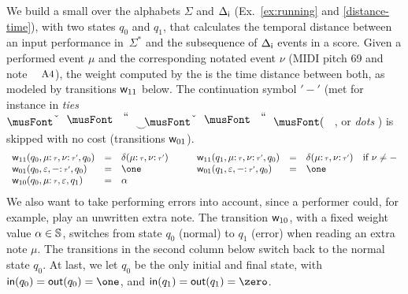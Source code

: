 \begin{example}\label{ex:SWT}
We build a small \SWT over the alphabets $\Sigma$ and ${\Delta_\mathsf{i}}$
(Ex.~\ref{ex:running} and \ref{distance-time}),
with two states $q_0$ and $q_1$, that
calculates the temporal distance between an input performance in~$\Sigma^*$
and the subsequence
of ${\Delta_\mathsf{i}}$ events in a score.
%
Given  a performed event $\mu$
and the corresponding notated event $\nu$
(\eg MIDI pitch 69 and note $\mbox{\footnotesize A4}$),
the weight  computed by the \SWT is the time distance between both,
as modeled by transitions $\mathsf{w}_{11}$ below.
%
The continuation symbol $'-'$
(met for instance in \emph{ties}
$\musQuarter\!\!\!\mathrel{\raisebox{-1.5mm}{$\smile$}}\!\!\!\musEighth$,
or \emph{dots} \musQuarterDotted{})
is  skipped with no cost (transitions $\mathsf{w}_{01}$).
\[
\begin{array}{lclclcll}
\wei_{11}(q_0, \mu\tstamp{\tau}, \nu\tstamp{\tau'}, q_0) & = &
     \delta(\mu\tstamp{\tau}, \nu\tstamp{\tau'}) & \quad & %
\wei_{11}(q_1, \mu\tstamp{\tau}, \nu\tstamp{\tau'}, q_0) & = &
     \delta(\mu\tstamp{\tau}, \nu\tstamp{\tau'}) &
     \mbox{if~} \nu \neq - \\ %
\wei_{01}(q_0, \varepsilon, \mathsf{-}\tstamp{\tau'}, q_0) & = & \one & &
\wei_{01}(q_1, \varepsilon, \mathsf{-}\tstamp{\tau'}, q_0) & = & \one\\
\wei_{10}(q_0, \mu\tstamp{\tau}, \varepsilon, q_1) & = & \alpha & & %
\end{array}
\]
%
We also want to take performing errors into account,
since a performer could, for example, play an unwritten extra note.
%
The transition $\mathsf{w}_{10}$,
with a fixed weight value $\alpha \in \mathbb{S}$,
switches from state $q_0$ (normal) to $q_1$ (error)
when reading an extra note $\mu$.
The transitions in the second column below switch back to the normal state $q_0$.
At last, we let $q_0$ be the only initial and final state, with
$\init(q_0) = \final(q_0) = \one$, and
$\init(q_1) = \final(q_1) = \zero$.
\endex
\end{example}

